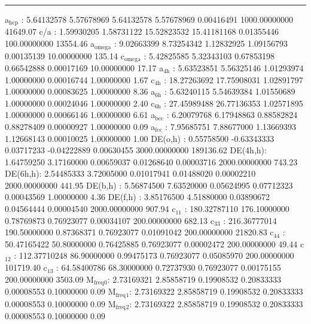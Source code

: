 \documentclass[11pt]{article}
\begin{document}
\noindent\rule{\textwidth}{0.5pt}
a\(_{\text{hcp}}\)   :   5.64132578   5.57678969   5.64132578   5.57678969   0.00416491 1000.00000000     41649.07
c/a     :   1.59930205   1.58731122  15.52823532  15.41181168   0.01355446 100.00000000     13554.46
a\(_{\text{omega}}\) :   9.02663399   8.73254342   1.12832925   1.09156793   0.00135139  10.00000000       135.14
c\(_{\text{omega}}\) :   5.42825585   5.32343103   0.67853198   0.66542888   0.00017169  10.00000000        17.17
a\(_{\text{4h}}\)    :   5.63523851   5.56325146   1.01293974   1.00000000   0.00016744   1.00000000         1.67
c\(_{\text{4h}}\)    :  18.27263692  17.75908031   1.02891797   1.00000000   0.00083625   1.00000000         8.36
a\(_{\text{6h}}\)    :   5.63240115   5.54639384   1.01550689   1.00000000   0.00024046   1.00000000         2.40
c\(_{\text{6h}}\)    :  27.45989488  26.77136353   1.02571895   1.00000000   0.00066146   1.00000000         6.61
a\(_{\text{bcc}}\)   :   6.20079768   6.17948863   0.88582824   0.88278409   0.00000927   1.00000000         0.09
a\(_{\text{fcc}}\)   :   7.95685751   7.88677000   1.13669393   1.12668143   0.00010025   1.00000000         1.00
DE(o,h) :   0.55758500  -0.63343333   0.03717233  -0.04222889   0.00630455 3000.00000000    189136.62
DE(4h,h):   1.64759250   3.17160000   0.00659037   0.01268640   0.00003716 2000.00000000       743.23
DE(6h,h):   2.54485333   3.72005000   0.01017941   0.01488020   0.00002210 2000.00000000       441.95
DE(b,h) :   5.56874500   7.63520000   0.05624995   0.07712323   0.00043569   1.00000000         4.36
DE(f,h) :   3.85176500   4.51880000   0.03890672   0.04564444   0.00004540 2000.00000000       907.94
c\(_{\text{11}}\)    : 180.32787110 176.10000000   0.78769873   0.76923077   0.00034107 200.00000000       682.13
c\(_{\text{33}}\)    : 216.36777014 190.50000000   0.87368371   0.76923077   0.01091042 200.00000000     21820.83
c\(_{\text{44}}\)    :  50.47165422  50.80000000   0.76425885   0.76923077   0.00002472 200.00000000        49.44
c\(_{\text{12}}\)    : 112.37710248  86.90000000   0.99475173   0.76923077   0.05085970 200.00000000    101719.40
c\(_{\text{13}}\)    :  64.58400786  68.30000000   0.72737930   0.76923077   0.00175155 200.00000000      3503.09
M\(_{\text{freq}}\)\(_{\text{0}}\):   2.73169321   2.85858719   0.19908532   0.20833333   0.00008553   0.10000000         0.09
M\(_{\text{freq}}\)\(_{\text{1}}\):   2.73169322   2.85858719   0.19908532   0.20833333   0.00008553   0.10000000         0.09
M\(_{\text{freq}}\)\(_{\text{2}}\):   2.73169322   2.85858719   0.19908532   0.20833333   0.00008553   0.10000000         0.09
\end{document}
